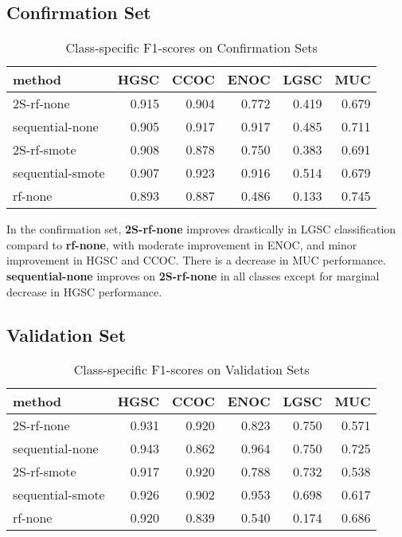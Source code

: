 \documentclass[
]{report}
\begin{document}
\hypertarget{confirmation-set}{%
\subsection{Confirmation Set}\label{confirmation-set}}

\begin{table}

\caption{\label{tab:confirmation-set}Class-specific F1-scores on Confirmation Sets}
\centering
\begin{tabular}[t]{l|r|r|r|r|r}
\hline
method & HGSC & CCOC & ENOC & LGSC & MUC\\
\hline
2S-rf-none & 0.915 & 0.904 & 0.772 & 0.419 & 0.679\\
\hline
sequential-none & 0.905 & 0.917 & 0.917 & 0.485 & 0.711\\
\hline
2S-rf-smote & 0.908 & 0.878 & 0.750 & 0.383 & 0.691\\
\hline
sequential-smote & 0.907 & 0.923 & 0.916 & 0.514 & 0.679\\
\hline
rf-none & 0.893 & 0.887 & 0.486 & 0.133 & 0.745\\
\hline
\end{tabular}
\end{table}

In the confirmation set, \textbf{2S-rf-none} improves drastically in LGSC classification compard to \textbf{rf-none}, with moderate improvement in ENOC, and minor improvement in HGSC and CCOC. There is a decrease in MUC performance. \textbf{sequential-none} improves on \textbf{2S-rf-none} in all classes except for marginal decrease in HGSC performance.

\hypertarget{validation-set}{%
\subsection{Validation Set}\label{validation-set}}

\begin{table}

\caption{\label{tab:validation-set}Class-specific F1-scores on Validation Sets}
\centering
\begin{tabular}[t]{l|r|r|r|r|r}
\hline
method & HGSC & CCOC & ENOC & LGSC & MUC\\
\hline
2S-rf-none & 0.931 & 0.920 & 0.823 & 0.750 & 0.571\\
\hline
sequential-none & 0.943 & 0.862 & 0.964 & 0.750 & 0.725\\
\hline
2S-rf-smote & 0.917 & 0.920 & 0.788 & 0.732 & 0.538\\
\hline
sequential-smote & 0.926 & 0.902 & 0.953 & 0.698 & 0.617\\
\hline
rf-none & 0.920 & 0.839 & 0.540 & 0.174 & 0.686\\
\hline
\end{tabular}
\end{table}
\end{document}
